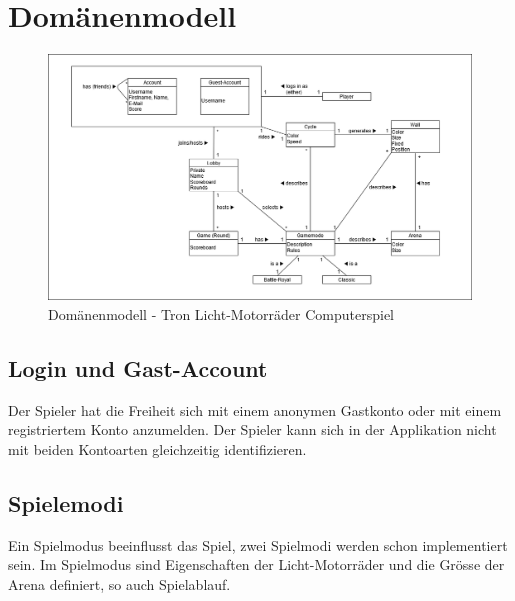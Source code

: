 \documentclass[11pt,ngerman]{article}
\begin{document}
    \section{Domänenmodell}
    \begin{figure}[H]
	    \includegraphics[scale=0.45]{figures/domain_model.png}
	    \caption{Domänenmodell - Tron Licht-Motorräder Computerspiel}
	\end{figure}
	\subsection{Login und Gast-Account}
		Der Spieler hat die Freiheit sich mit einem anonymen Gastkonto  oder mit einem registriertem Konto anzumelden. Der Spieler kann sich in der Applikation nicht mit beiden Kontoarten gleichzeitig identifizieren.

	\subsection{Spielemodi}
		Ein Spielmodus beeinflusst das Spiel, zwei Spielmodi werden schon implementiert sein. Im Spielmodus sind Eigenschaften der Licht-Motorräder und die Grösse der Arena definiert, so auch Spielablauf.
\end{document}
